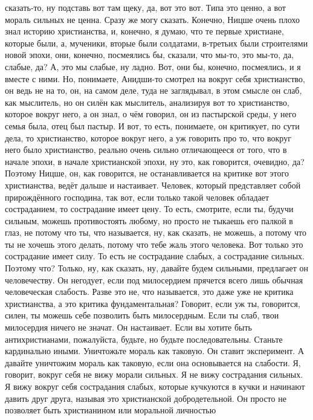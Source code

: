 сказать-то, ну подставь вот там щеку, да, вот это вот. Типа это ценно, а вот
мораль сильных не ценна. Сразу же могу сказать. Конечно, Ницше очень плохо знал
историю христианства, и, конечно, я думаю, что те первые христиане, которые
были, а, мученики, вторые были солдатами, в-третьих были строителями новой
эпохи, они, конечно, посмеялись бы, сказали, что мы-то, это мы-то, да, слабые,
да? А, это мы слабые, ну ладно. Вот, они бы, конечно, посмеялись, и я вместе с
ними. Но, понимаете, Анидши-то смотрел на вокруг себя христианство, он ведь не
на то, он, на самом деле, туда не заглядывал, в этом смысле он слаб, как
мыслитель, но он силён как мыслитель, анализируя вот то христианство, которое
вокруг него, а он знал, о чём говорил, он из пастырской среды, у него семья
была, отец был пастыр. И вот, то есть, понимаете, он критикует, по сути дела, то
христианство, которое вокруг него, а уж говорить про то, что вокруг него было
христианство, реально очень сильно отличающееся от того, что в начале эпохи, в
начале христианской эпохи, ну это, как говорится, очевидно, да? Поэтому Ницше,
он, как говорится, не останавливается на критике вот этого христианства, ведёт
дальше и настаивает. Человек, который представляет собой прирождённого
господина, так вот, если только такой человек обладает состраданием, то
сострадание имеет цену. То есть, смотрите, если ты, будучи сильным, можешь
противостоять любому, но просто не тыкаешь его палкой в глаз, не потому что ты,
что называется, ну, как сказать, не можешь, а потому что ты не хочешь этого
делать, потому что тебе жаль этого человека. Вот только это сострадание имеет
силу. То есть не сострадание слабых, а сострадание сильных. Поэтому что? Только,
ну, как сказать, ну, давайте будем сильными, предлагает он человечеству. Он
негодует, если под милосердием прячется всего лишь обычная человеческая
слабость. Разве это не, что называется, это даже уже не критика христианства, а
это критика фундаментальная? Говорит, если уж ты, говорится, силен, ты можешь
себе позволить быть милосердным. Если ты слаб, твои милосердия ничего не значат.
Он настаивает. Если вы хотите быть антихристианами, пожалуйста, будьте, но
будьте последовательны. Станьте кардинально иными. Уничтожьте мораль как
таковую. Он ставит эксперимент. А давайте уничтожим мораль как таковую, если она
основывается на слабости. Я, говорит, вокруг себя не вижу морали сильных. Я не
вижу сострадания сильных. Я вижу вокруг себя сострадания слабых, которые
кучкуются в кучки и начинают давить друг друга, называя это христианской
добродетельной. Он просто не позволяет быть христианином или моральной личностью
